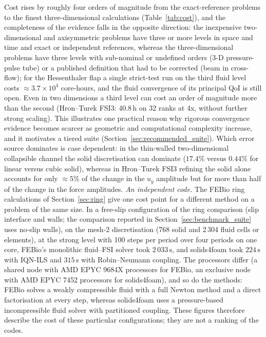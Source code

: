 Cost rises by roughly four orders of magnitude from the exact-reference problems to the finest three-dimensional calculations (Table~\ref{tab:cost}), and the completeness of the evidence falls in the opposite direction: the inexpensive two-dimensional and axisymmetric problems have three or more levels in space and time and exact or independent references, whereas the three-dimensional problems have three levels with sub-nominal or undefined orders (3-D pressure-pulse tube) or a published definition that had to be corrected (beam in cross-flow); for the Hessenthaler flap a single strict-test run on the third fluid level costs $\approx3.7\times10^{4}$ core-hours, and the fluid convergence of its principal QoI is still open. Even in two dimensions a third level can cost an order of magnitude more than the second (Hron--Turek FSI3: 40.8\,h on 32 ranks at 4x, without further strong scaling).
This illustrates one practical reason why rigorous convergence evidence becomes scarcer as geometric and computational complexity increase, and it motivates a tiered suite (Section~\ref{sec:recommended_suite}).
Which error source dominates is case dependent: in the thin-walled two-dimensional collapsible channel the solid discretisation can dominate ($17.4\%$ versus $0.44\%$ for linear versus cubic solid), whereas in Hron--Turek FSI3 refining the solid alone accounts for only $\approx5\%$ of the change in the $u_y$ amplitude but for more than half of the change in the force amplitudes.
\emph{An independent code.}
The FEBio ring calculations of Section~\ref{sec:ring} give one cost point for a different method on a problem of the same size.
In a free-slip configuration of the ring comparison (slip interface and walls; the comparison reported in Section~\ref{sec:benchmark_suite} uses no-slip walls), on the mesh-2 discretisation (768 solid and 2\,304 fluid cells or elements), at the strong level with 100 steps per period over four periods on one core, FEBio's monolithic fluid--FSI solver took $2\,033\,\mathrm{s}$, and solids4foam took $224\,\mathrm{s}$ with IQN-ILS and $315\,\mathrm{s}$ with Robin--Neumann coupling.
The processors differ (a shared node with AMD EPYC 9684X processors for FEBio, an exclusive node with AMD EPYC 7452 processors for solids4foam), and so do the methods: FEBio solves a weakly compressible fluid with a full Newton method and a direct factorisation at every step, whereas solids4foam uses a pressure-based incompressible fluid solver with partitioned coupling.
These figures therefore describe the cost of these particular configurations; they are not a ranking of the codes.
